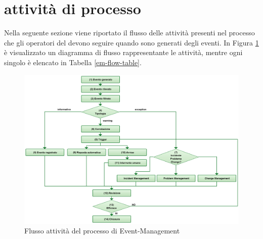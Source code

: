 %
%
\section[Attività di processo]{attività di processo}
\label{em-flow}
Nella seguente sezione viene riportato il flusso delle attività presenti nel processo che gli operatori del  devono seguire quando sono generati degli eventi. In Figura \ref{em-flow-img} è visualizzato un diagramma di flusso rappresentante le attività, mentre ogni singolo  è elencato in Tabella \ref{em-flow-table}.

\begin{figure}[htbp]
\centering
\includegraphics[scale=0.2]{Images/Diagrams/Event_Management.png}
\caption{Flusso attività del processo di \ac{Event-Management}}
\label{em-flow-img}
\end{figure}


